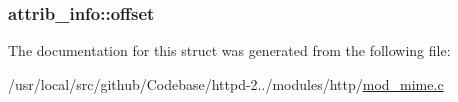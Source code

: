 \subsubsection[{\texorpdfstring{offset}{offset}}]{ attrib\+\_\+info\+::offset}\hypertarget{structattrib__info_a38df5936462a697603cf95588172ba66}{}\label{structattrib__info_a38df5936462a697603cf95588172ba66}


The documentation for this struct was generated from the following file\+:\begin{DoxyCompactItemize}
\item 
/usr/local/src/github/\+Codebase/httpd-\/2../modules/http/\hyperlink{mod__mime_8c}{mod\+\_\+mime.\+c}\end{DoxyCompactItemize}
